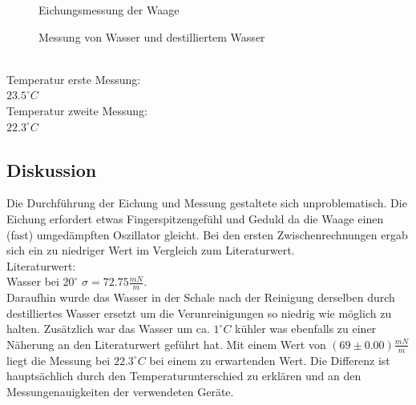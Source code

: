 \documentclass[12pt,a4paper]{article}
\begin{document}
\begin{multicols}{2}
\begin{figure}[H]
	\centering
	\caption{Eichungsmessung der Waage}
	\label{fig:oberflaeche_eichung}
\end{figure}
\noindent

\begin{figure}[H]
	\centering
	\caption{Messung von Wasser und destilliertem Wasser}
	\label{fig:oberflaeche_messung}
\end{figure}
\noindent
\\
Temperatur erste Messung:\\
$23.5^{\circ}C$\\
Temperatur zweite Messung:\\
$22.3^{\circ}C$\\
\subsection{Diskussion}
Die Durchführung der Eichung und Messung gestaltete sich unproblematisch. Die Eichung erfordert etwas Fingerspitzengefühl und Geduld da die Waage einen (fast) umgedämpften Oszillator gleicht. Bei den ersten Zwischenrechnungen ergab sich ein zu niedriger Wert im Vergleich zum Literaturwert. \\
Literaturwert: \\
Wasser bei $20^{\circ}$ $\sigma = 72.75 \frac{mN}{m}$.\\
Daraufhin wurde das Wasser in der Schale nach der Reinigung derselben durch destilliertes Wasser ersetzt um die Verunreinigungen so niedrig wie möglich zu halten. Zusätzlich war das Wasser um ca. $1^{\circ}C$ kühler was ebenfalls zu einer Näherung an den Literaturwert geführt hat. Mit einem Wert von $(69 \pm 0.00) \frac{mN}{m}$ liegt die Messung bei $22.3^{\circ}C$ bei einem zu erwartenden Wert. Die Differenz ist hauptsächlich durch den Temperaturunterschied zu erklären und an den Messungenauigkeiten der verwendeten Geräte. %


\end{multicols}
\end{document}
